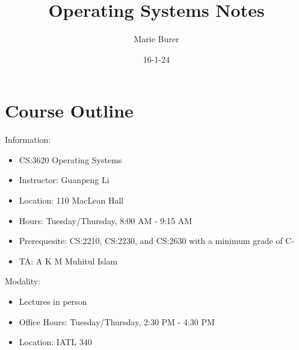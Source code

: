 \documentclass[12pt]{article}
\title{Operating Systems Notes}
\author{Marie Burer}
\date{16-1-24}
\begin{document}
\maketitle
\newpage

\tableofcontents

\newpage

\section*{Course Outline}

Information:
\begin{itemize}
    \item CS:3620 Operating Systems
    \item Instructor: Guanpeng Li
    \item Location: 110 MacLean Hall
    \item Hours: Tuesday/Thursday, 8:00 AM - 9:15 AM
    \item Prerequesite: CS:2210, CS:2230, and CS:2630 with a minimum grade of C-
    \item TA: A K M Muhitul Islam
\end{itemize}

Modality:
\begin{itemize}
    \item Lectures in person
    \item Office Hours: Tuesday/Thursday, 2:30 PM - 4:30 PM
    \item Location: IATL 340
\end{itemize}
\end{document}
